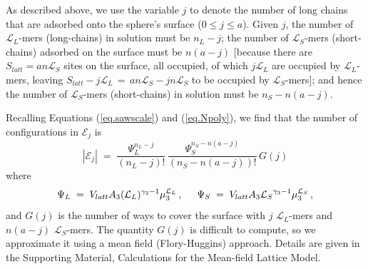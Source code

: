 \documentclass[journal=mamobx,manuscript=article]{achemso}
\newcommand{\leng}{\mathcal{L}}
\begin{document}
 As described above, we use the variable $j$ to 
 denote the number of long chains that are adsorbed
 onto the sphere's surface ($0\leq j\leq a$).
 Given $j$, the number of $\leng_L$-mers (long-chains) in solution must be $n_L-j$; 
 the number of $\leng_S$-mers (short-chains) adsorbed on the surface must be $n(a-j)$ [because there are $S_{latt}=an\leng_S$ sites on the surface, all occupied, of which $j\leng_L$ are occupied by $\leng_L$-mers, leaving $S_{latt}-j\leng_L\,=\, an\leng_S-jn\leng_S$ to be  occupied by $\leng_S$-mers]; 
 and hence the number of $\leng_S$-mers (short-chains) in solution must be  $n_S-n(a-j)$.

Recalling Equations (\ref{eq.sawscale}) and 
(\ref{eq.Npoly}), we find that the number of configurations in $\mathcal{E}_j$ is
\begin{equation}
    |\mathcal{E}_j|  
      \; = \; \frac{ \Psi_L^{n_L-j} }{(n_L-j)!} \,
          \frac{ \Psi_S^{n_S-n(a-j)} }{(n_S-n(a-j))!} \,  G(j)
        \label{eq.Yj}
\end{equation}
where 
\begin{equation}
    \label{eq.psidef}   
   \Psi_L\;=\;V_{latt} A_3 (\leng_L)^{\gamma_3-1} \mu_{3}^{\leng_L} \,,  
    \hspace{5mm} %
     \Psi_S \;=\; V_{latt}A_3{\leng_S}^{\gamma_3-1}\mu_3^{\leng_S} \,,
\end{equation}
and $G(j)$ is the number of ways to cover the surface
with $j$ $\leng_L$-mers and $n(a-j)$ $\leng_S$-mers.
The quantity $G(j)$ is difficult to compute, so we
approximate it using a mean field (Flory-Huggins) approach.  Details are given in the Supporting 
Material, Calculations for the Mean-field Lattice Model.
\end{document}
